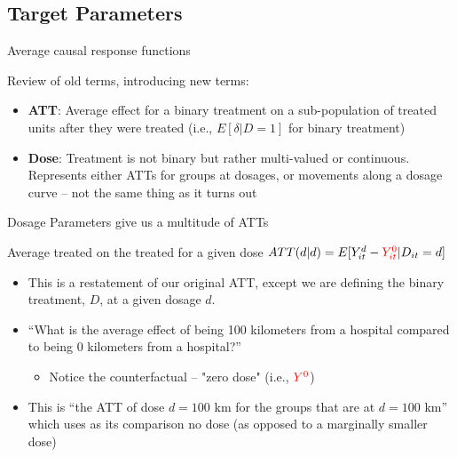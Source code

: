 \documentclass{beamer}
\begin{document}
\subsection{Target Parameters}


\begin{frame}{Average causal response functions}


Review of old terms, introducing new terms:

\bigskip

\begin{itemize}
\item \textbf{ATT}: Average effect for a binary treatment on a sub-population of treated units after they were treated (i.e., $E[\delta|D=1]$ for binary treatment)
\item \textbf{Dose}: Treatment is not binary but rather multi-valued or continuous.  Represents either ATTs for groups at dosages, or movements along a dosage curve -- not the same thing as it turns out
\end{itemize}

\end{frame}





\begin{frame}{Dosage Parameters give us a multitude of ATTs}

\begin{block}{Average treated on the treated for a given dose}
$ATT(d|d) = E[Y^d_{it} - \textcolor{red}{Y^0_{it}} | D_{it}=d]$
\end{block}

\begin{itemize}
\item This is a restatement of our original ATT, except we are defining the binary treatment, $D$, at a given dosage $d$. 
\item ``What is the average effect of being 100 kilometers from a hospital compared to being 0 kilometers from a hospital?''
	\begin{itemize}
	\item Notice the counterfactual -- "zero dose" (i.e., $\textcolor{red}{Y^0}$)
	\end{itemize}
\item  This is ``the ATT of dose $d=100$ km for the groups that are at $d=100$ km'' which uses as its comparison no dose (as opposed to a marginally smaller dose)
\end{itemize}

\end{frame}
\end{document}
